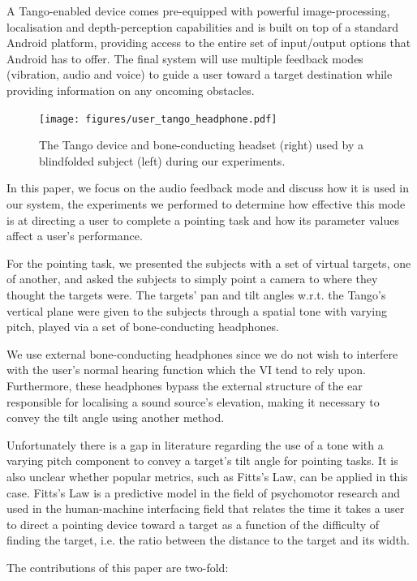 \documentclass[format=sigconf, review=true, screen=true, anonymous=true]{acmart}
\begin{document}
A Tango-enabled device comes pre-equipped with powerful image-processing, localisation and depth-perception capabilities and is built on top of a standard Android platform, providing access to the entire set of input/output options that Android has to offer. The final system will use multiple feedback modes (vibration, audio and voice) to guide a user toward a target destination while providing information on any oncoming obstacles.

\begin{figure}
  \centering
  \texttt{[image: figures/user\_tango\_headphone.pdf]}
  \caption{The Tango device and bone-conducting headset (right) used by a blindfolded subject (left) during our experiments. }
  \label{fig:tango}
\end{figure}

In this paper, we focus on the audio feedback mode and discuss how it is used in our system, the experiments we performed to determine how effective this mode is at directing a user to complete a pointing task and how its parameter values affect a user's performance. 

For the pointing task, we presented the subjects with a set of virtual targets, one of another, and asked the subjects to simply point a camera to where they thought the targets were. The targets' pan and tilt angles w.r.t. the Tango's vertical plane were given to the subjects through a spatial tone with varying pitch, played via a set of bone-conducting headphones.

We use external bone-conducting headphones since we do not wish to interfere with the user's normal hearing function which the VI tend to rely upon. Furthermore, these headphones bypass the external structure of the ear responsible for localising a sound source's elevation, making it necessary to convey the tilt angle using another method. 

Unfortunately there is a gap in literature regarding the use of a tone with a varying pitch component to convey a target's tilt angle for pointing tasks. It is also unclear whether popular metrics, such as Fitts's Law, can be applied in this case. Fitts's Law is a predictive model in the field of psychomotor research and used in the human-machine interfacing field that relates the time it takes a user to direct a pointing device toward a target as a function of the difficulty of finding the target, i.e. the ratio between the distance to the target and its width. 

The contributions of this paper are two-fold: 
\end{document}
